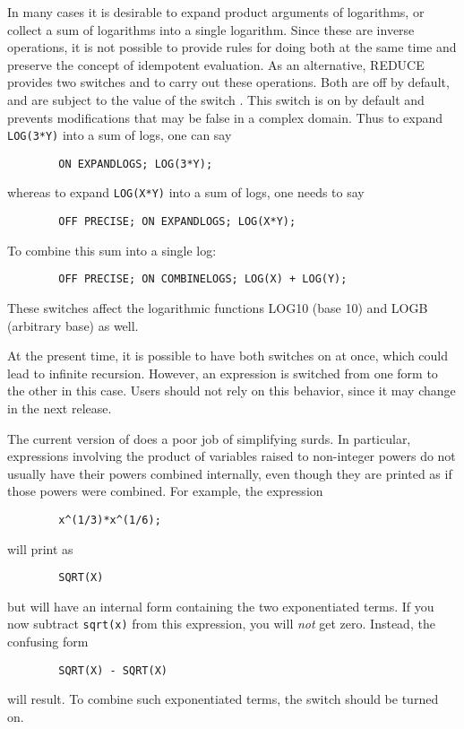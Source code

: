 \hypertarget{switch:COMBINELOGS}{}
\hypertarget{switch:EXPANDLOGS}{}
In many cases it is desirable to expand product arguments of logarithms,
or collect a sum of logarithms into a single logarithm.  Since these are
inverse operations, it is not possible to provide rules for doing both at
the same time and preserve the {\REDUCE} concept of idempotent evaluation.
As an alternative, REDUCE provides two switches 
 and  to carry
out these operations.  Both are off by default, and are subject 
to the value of the switch . This switch is on
by default and prevents modifications that may be false in a complex domain.
Thus to expand \texttt{LOG(3*Y)} into a sum of logs, one can say
\begin{verbatim}
        ON EXPANDLOGS; LOG(3*Y);
\end{verbatim}
whereas to expand \texttt{LOG(X*Y)} into a sum of logs, one needs to say
\begin{verbatim}
        OFF PRECISE; ON EXPANDLOGS; LOG(X*Y);
\end{verbatim}
To combine this sum into a single log:
\begin{verbatim}
        OFF PRECISE; ON COMBINELOGS; LOG(X) + LOG(Y);
\end{verbatim}

These switches affect the logarithmic functions LOG10 (base 10) and LOGB
(arbitrary base) as well.

At the present time, it is possible to have both switches on at once,
which could lead to infinite recursion.  However, an expression is
switched from one form to the other in this case.  Users should not rely
on this behavior, since it may change in the next release.

\hypertarget{switch:COMBINEEXPT}{}
The current version of {\REDUCE} does a poor job of simplifying surds.  In
particular, expressions involving the product of variables raised to
non-integer powers do not usually have their powers combined internally,
even though they are printed as if those powers were combined.  For
example, the expression
\begin{verbatim}
        x^(1/3)*x^(1/6);
\end{verbatim}
will print as
\begin{verbatim}
        SQRT(X)
\end{verbatim}
but will have an internal form containing the two exponentiated terms.
If you now subtract \texttt{sqrt(x)} from this expression, you will
\emph{not} get zero.  Instead, the confusing form
\begin{verbatim}
        SQRT(X) - SQRT(X)
\end{verbatim}
will result.  To combine such exponentiated terms, the switch
 should be turned on.

